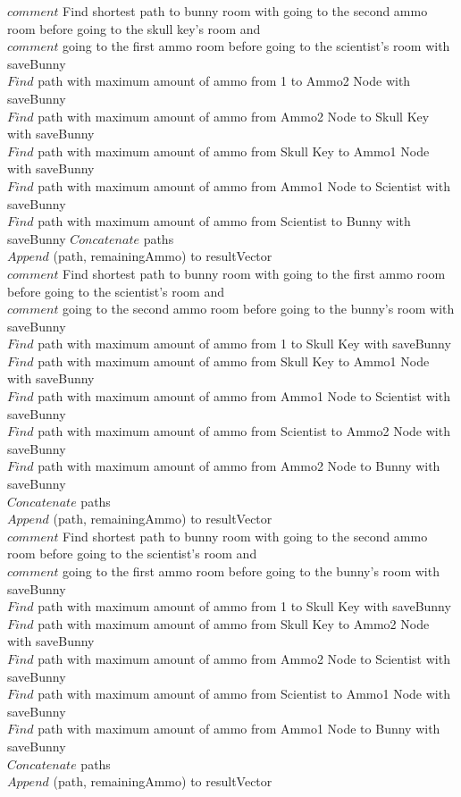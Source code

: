 \documentclass[10pt]{article}
\begin{document}
		$comment$  Find shortest path to bunny room with going to the second ammo room before going to the skull key's room and  \\
		$comment$ going to the first ammo room before going to the scientist's room with saveBunny \\
		 $Find$ path with maximum amount of ammo from 1 to Ammo2 Node with saveBunny  \\
		 $Find$ path with maximum amount of ammo from Ammo2 Node to Skull Key with saveBunny \\
		 $Find$ path with maximum amount of ammo from Skull Key to Ammo1 Node with saveBunny \\
		 $Find$ path with maximum amount of ammo from Ammo1 Node to Scientist with saveBunny \\
		 $Find$ path with maximum amount of ammo from Scientist to Bunny with saveBunny
		$Concatenate$ paths  \\
		$Append$ (path, remainingAmmo) to resultVector \\

		$comment$  Find shortest path to bunny room with going to the first ammo room before going to the scientist's room and  \\
		$comment$ going to the second ammo room before going to the bunny's room with saveBunny \\
		 $Find$ path with maximum amount of ammo from 1 to Skull Key with saveBunny  \\
		 $Find$ path with maximum amount of ammo from Skull Key to Ammo1 Node with saveBunny \\
		 $Find$ path with maximum amount of ammo from Ammo1 Node to Scientist with saveBunny \\
		 $Find$ path with maximum amount of ammo from Scientist to Ammo2 Node with saveBunny \\
		 $Find$ path with maximum amount of ammo from Ammo2 Node to Bunny with saveBunny \\
		$Concatenate$ paths  \\
		$Append$ (path, remainingAmmo) to resultVector \\

		$comment$  Find shortest path to bunny room with going to the second ammo room before going to the scientist's room and  \\
		$comment$ going to the first ammo room before going to the bunny's room with saveBunny \\
		 $Find$ path with maximum amount of ammo from 1 to Skull Key with saveBunny  \\
		 $Find$ path with maximum amount of ammo from Skull Key to Ammo2 Node with saveBunny \\
		 $Find$ path with maximum amount of ammo from Ammo2 Node to Scientist with saveBunny \\
		 $Find$ path with maximum amount of ammo from Scientist to Ammo1 Node with saveBunny \\
		 $Find$ path with maximum amount of ammo from Ammo1 Node to Bunny with saveBunny \\
		$Concatenate$ paths  \\
		$Append$ (path, remainingAmmo) to resultVector \\
\end{document}
